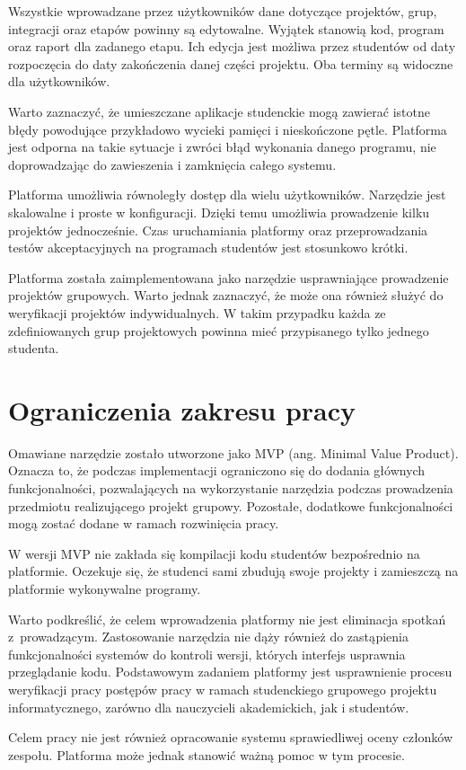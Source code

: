 Wszystkie wprowadzane przez użytkowników dane dotyczące projektów, grup, integracji oraz etapów powinny są edytowalne.
Wyjątek stanowią kod, program oraz raport dla zadanego etapu.
Ich edycja jest możliwa przez studentów od daty rozpoczęcia do daty zakończenia danej części projektu.
Oba terminy są widoczne dla użytkowników.

Warto zaznaczyć, że umieszczane aplikacje studenckie mogą zawierać istotne błędy powodujące przykładowo wycieki pamięci i nieskończone pętle.
Platforma jest odporna na takie sytuacje i zwróci błąd wykonania danego programu, nie doprowadzając do zawieszenia i zamknięcia całego systemu.

Platforma umożliwia równoległy dostęp dla wielu użytkowników.
Narzędzie jest skalowalne i proste w konfiguracji.
Dzięki temu umożliwia prowadzenie kilku projektów jednocześnie.
Czas uruchamiania platformy oraz przeprowadzania testów akceptacyjnych na programach studentów jest stosunkowo krótki.

Platforma została zaimplementowana jako narzędzie usprawniające prowadzenie projektów grupowych.
Warto jednak zaznaczyć, że może ona również służyć do weryfikacji projektów indywidualnych.
W takim przypadku każda ze zdefiniowanych grup projektowych powinna mieć przypisanego tylko jednego studenta.


\section{Ograniczenia zakresu pracy}

Omawiane narzędzie zostało utworzone jako MVP (ang. Minimal Value Product).
Oznacza to, że podczas implementacji ograniczono się do dodania głównych funkcjonalności, pozwalających na wykorzystanie narzędzia podczas prowadzenia przedmiotu realizującego projekt grupowy.
Pozostałe, dodatkowe funkcjonalności mogą zostać dodane w ramach rozwinięcia pracy.

W wersji MVP nie zakłada się kompilacji kodu studentów bezpośrednio na platformie.
Oczekuje się, że studenci sami zbudują swoje projekty i zamieszczą na platformie wykonywalne programy.

Warto podkreślić, że celem wprowadzenia platformy nie jest eliminacja spotkań z~prowadzącym.
Zastosowanie narzędzia nie dąży również do zastąpienia funkcjonalności systemów do kontroli wersji, których interfejs usprawnia przeglądanie kodu.
Podstawowym zadaniem platformy jest usprawnienie procesu weryfikacji pracy postępów pracy w ramach studenckiego grupowego projektu informatycznego, zarówno dla nauczycieli akademickich, jak i studentów.

Celem pracy nie jest również opracowanie systemu sprawiedliwej oceny członków zespołu.
Platforma może jednak stanowić ważną pomoc w tym procesie.




